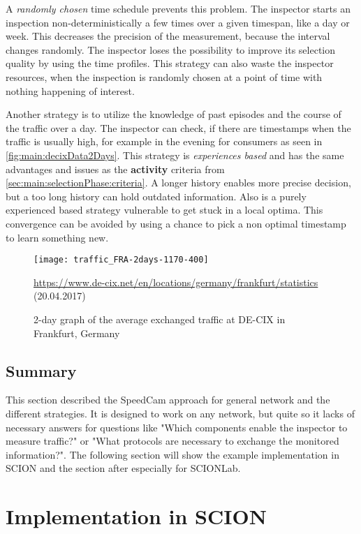 \documentclass[thesis.tex]{subfiles}
\begin{document}
A \textit{randomly chosen} time schedule prevents this problem. The inspector starts an inspection non-deterministically a few times over a given timespan, like a day or week. This decreases the precision of the measurement, because the interval changes randomly. The inspector loses the possibility to improve its selection quality by using the time profiles. This strategy can also waste the inspector resources, when the inspection is randomly chosen at a point of time with nothing happening of interest.

Another strategy is to utilize the knowledge of past episodes and the course of the traffic over a day. The inspector can check, if there are timestamps when the traffic is usually high, for example in the evening for consumers as seen in \autoref{fig:main:decixData2Days}. This strategy is \textit{experiences based} and has the same advantages and issues as the \textbf{activity} criteria from \autoref{sec:main:selectionPhase:criteria}. A longer history enables more precise decision, but a too long history can hold outdated information. Also is a purely experienced based strategy vulnerable to get stuck in a local optima. This convergence can be avoided by using a chance to pick a non optimal timestamp to learn something new.

\begin{figure} [h]
	\centering
	\texttt{[image: traffic\_FRA-2days-1170-400]}
	\caption*{\tiny{ \url{https://www.de-cix.net/en/locations/germany/frankfurt/statistics} (20.04.2017)}}
	\caption{2-day graph of the average exchanged traffic at DE-CIX in Frankfurt, Germany}
	\label{fig:main:decixData2Days}
\end{figure}

\subsection{Summary}
This section described the SpeedCam approach for general network and the different strategies. It is designed to work on any network, but quite so it lacks of necessary answers for questions like "Which components enable the inspector to measure traffic?" or "What protocols are necessary to exchange the monitored information?". The following section will show the example implementation in SCION and the section after especially for SCIONLab.

\section{Implementation in SCION} \label{sec:main:scionimpl}
\end{document}
